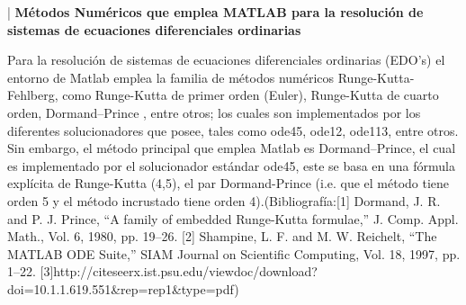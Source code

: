 \documentclass[10pt,a4paper]{article}
\begin{document}
\begin{center}|
{\Large \textbf{M\' etodos Num\' ericos que emplea MATLAB para la resoluci\' on de sistemas de ecuaciones diferenciales ordinarias}}\\
\end{center}
 
Para la resolución de sistemas de ecuaciones diferenciales ordinarias (EDO's) el entorno de Matlab emplea la familia de m\' etodos num\' ericos Runge-Kutta-Fehlberg, como Runge-Kutta de primer orden (Euler), Runge-Kutta de cuarto orden, Dormand–Prince , entre otros; los cuales son implementados por los diferentes solucionadores que posee, tales como ode45, ode12, ode113, entre otros. Sin embargo, el m\' etodo principal que emplea Matlab es Dormand–Prince, el cual es implementado por el solucionador estándar ode45, este  se basa en una fórmula explícita de Runge-Kutta (4,5), el par Dormand-Prince (i.e. que el m\' etodo tiene orden 5 y el m\' etodo incrustado tiene orden 4).(Bibliograf\' ia:[1] Dormand, J. R. and P. J. Prince, “A family of embedded Runge-Kutta formulae,” J. Comp. Appl. Math., Vol. 6, 1980, pp. 19–26.
[2] Shampine, L. F. and M. W. Reichelt, “The MATLAB ODE Suite,” SIAM Journal on Scientific Computing, Vol. 18, 1997, pp. 1–22. [3]http://citeseerx.ist.psu.edu/viewdoc/download?doi=10.1.1.619.551&rep=rep1&type=pdf)
\end{document}
